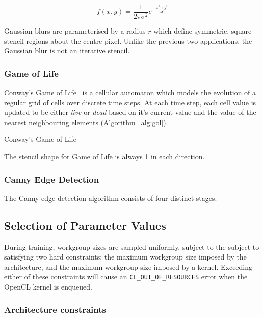 \begin{equation}
f(x,y) = \frac{1}{2\pi\sigma^2}e^{-\frac{x^2 + y^2}{2\sigma^2}}
\end{equation}

Gaussian blurs are parameterised by a radius $r$ which define
symmetric, square stencil regions about the centre
pixel.  Unlike the
previous two applications, the Gaussian blur is not an iterative
stencil.

\subsubsection{Game of Life}

Conway's Game of Life~\cite{Conway1970} is a cellular automaton which
models the evolution of a regular grid of cells over discrete time
steps. At each time step, each cell value is updated to be either
\emph{live} or \emph{dead} based on it's current value and the value
of the nearest neighbouring elements (Algorithm~\ref{alg:gol}).

\begin{algorithm}[b]
\caption{Conway's Game of Life}
\label{alg:gol}

\end{algorithm}

The stencil shape for Game of Life is always 1 in each direction.

\subsubsection{Canny Edge Detection}

The Canny edge detection algorithm consists of four distinct stages:


\subsection{Selection of Parameter Values}

During training, workgroup sizes are sampled uniformly, subject to the
subject to satisfying two hard constraints: the maximum workgroup size
imposed by the architecture, and the maximum workgroup size imposed by
a kernel. Exceeding either of these constraints will cause an
\texttt{CL\_OUT\_OF\_RESOURCES} error when the OpenCL kernel is
enqueued.

\subsubsection{Architecture constraints}


